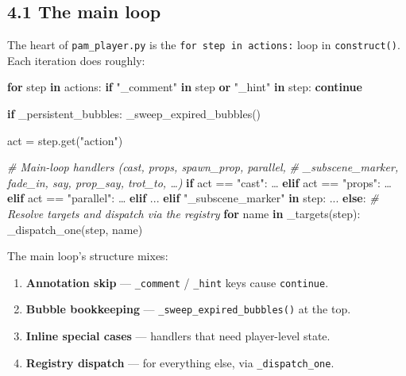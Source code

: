 \documentclass[
  12pt,
  letterpaper,
]{book}
\newenvironment{Shaded}{}{}
\newcommand{\CommentTok}[1]{\textcolor[rgb]{0.38,0.63,0.69}{\textit{#1}}}
\newcommand{\ControlFlowTok}[1]{\textcolor[rgb]{0.00,0.44,0.13}{\textbf{#1}}}
\newcommand{\KeywordTok}[1]{\textcolor[rgb]{0.00,0.44,0.13}{\textbf{#1}}}
\newcommand{\NormalTok}[1]{#1}
\newcommand{\OperatorTok}[1]{\textcolor[rgb]{0.40,0.40,0.40}{#1}}
\newcommand{\StringTok}[1]{\textcolor[rgb]{0.25,0.44,0.63}{#1}}
\providecommand{\tightlist}{%
  \setlength{\itemsep}{0pt}\setlength{\parskip}{0pt}}
\begin{document}
\subsection{4.1 The main loop}\label{the-main-loop}

The heart of \texttt{pam\_player.py} is the
\texttt{for\ step\ in\ actions:} loop in \texttt{construct()}. Each
iteration does roughly:

\begin{Shaded}
\begin{Highlighting}[]
\ControlFlowTok{for}\NormalTok{ step }\KeywordTok{in}\NormalTok{ actions:}
    \ControlFlowTok{if} \StringTok{"\_comment"} \KeywordTok{in}\NormalTok{ step }\KeywordTok{or} \StringTok{"\_hint"} \KeywordTok{in}\NormalTok{ step:}
        \ControlFlowTok{continue}

    \ControlFlowTok{if}\NormalTok{ \_persistent\_bubbles:}
\NormalTok{        \_sweep\_expired\_bubbles()}

\NormalTok{    act }\OperatorTok{=}\NormalTok{ step.get(}\StringTok{"action"}\NormalTok{)}

    \CommentTok{\# Main{-}loop handlers (cast, props, spawn\_prop, parallel,}
    \CommentTok{\# \_subscene\_marker, fade\_in, say, prop\_say, trot\_to, …)}
    \ControlFlowTok{if}\NormalTok{ act }\OperatorTok{==} \StringTok{"cast"}\NormalTok{: …}
    \ControlFlowTok{elif}\NormalTok{ act }\OperatorTok{==} \StringTok{"props"}\NormalTok{: …}
    \ControlFlowTok{elif}\NormalTok{ act }\OperatorTok{==} \StringTok{"parallel"}\NormalTok{: …}
    \ControlFlowTok{elif}\NormalTok{ ...}
    \ControlFlowTok{elif} \StringTok{"\_subscene\_marker"} \KeywordTok{in}\NormalTok{ step:}
\NormalTok{        ...}
    \ControlFlowTok{else}\NormalTok{:}
        \CommentTok{\# Resolve targets and dispatch via the registry}
        \ControlFlowTok{for}\NormalTok{ name }\KeywordTok{in}\NormalTok{ \_targets(step):}
\NormalTok{            \_dispatch\_one(step, name)}
\end{Highlighting}
\end{Shaded}

The main loop's structure mixes:

\begin{enumerate}
\def\labelenumi{\arabic{enumi}.}
\tightlist
\item
  \textbf{Annotation skip} --- \texttt{\_comment} / \texttt{\_hint} keys
  cause \texttt{continue}.
\item
  \textbf{Bubble bookkeeping} --- \texttt{\_sweep\_expired\_bubbles()}
  at the top.
\item
  \textbf{Inline special cases} --- handlers that need player-level
  state.
\item
  \textbf{Registry dispatch} --- for everything else, via
  \texttt{\_dispatch\_one}.
\end{enumerate}
\end{document}
